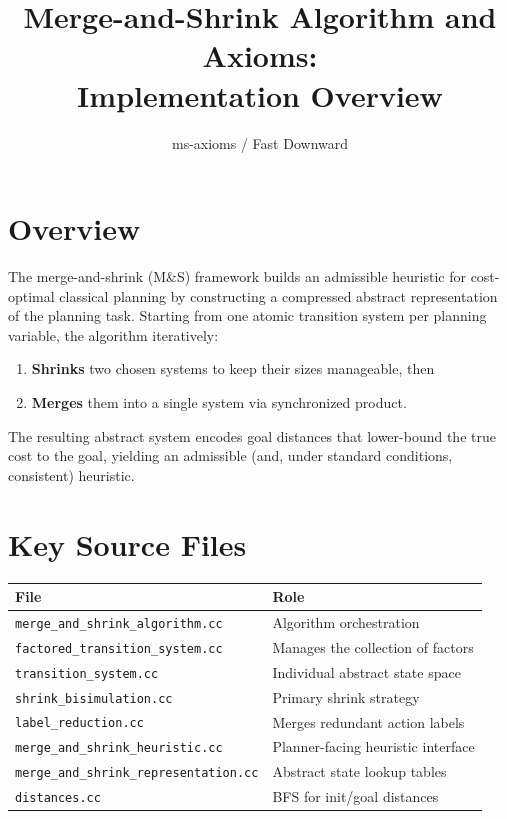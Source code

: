 \documentclass[11pt,a4paper]{article}
\title{Merge-and-Shrink Algorithm and Axioms:\\Implementation Overview}
\author{ms-axioms / Fast Downward}
\date{}
\begin{document}
\maketitle
\tableofcontents
\newpage

\section{Overview}

The merge-and-shrink (M\&S) framework builds an admissible heuristic for
cost-optimal classical planning by constructing a compressed abstract
representation of the planning task.  Starting from one atomic transition
system per planning variable, the algorithm iteratively:

\begin{enumerate}
  \item \textbf{Shrinks} two chosen systems to keep their sizes manageable, then
  \item \textbf{Merges} them into a single system via synchronized product.
\end{enumerate}

The resulting abstract system encodes goal distances that lower-bound the true
cost to the goal, yielding an admissible (and, under standard conditions,
consistent) heuristic.

\section{Key Source Files}

\begin{center}
\begin{tabular}{ll}
\toprule
\textbf{File} & \textbf{Role} \\
\midrule
\texttt{merge\_and\_shrink\_algorithm.cc} & Algorithm orchestration \\
\texttt{factored\_transition\_system.cc} & Manages the collection of factors \\
\texttt{transition\_system.cc} & Individual abstract state space \\
\texttt{shrink\_bisimulation.cc} & Primary shrink strategy \\
\texttt{label\_reduction.cc} & Merges redundant action labels \\
\texttt{merge\_and\_shrink\_heuristic.cc} & Planner-facing heuristic interface \\
\texttt{merge\_and\_shrink\_representation.cc} & Abstract state lookup tables \\
\texttt{distances.cc} & BFS for init/goal distances \\
\bottomrule
\end{tabular}
\end{center}
\end{document}
